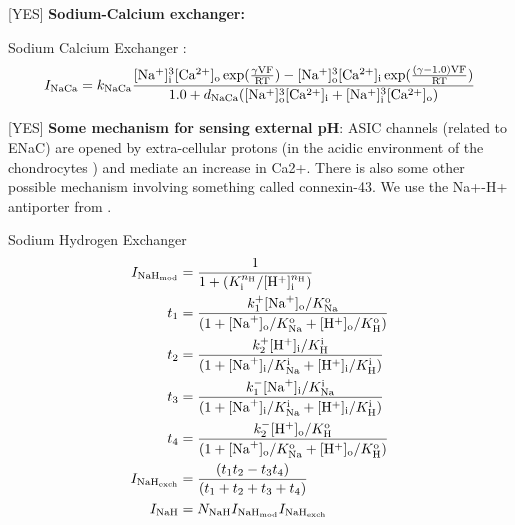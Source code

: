 [YES] {\bf Sodium-Calcium exchanger:}

Sodium Calcium Exchanger \citep[Table 13, pp. 77]{Nygrenetal1998}:
\begin{equation}
  I_{\rm NaCa} = k_{\rm NaCa} \frac{[\rm Na^{+}]^{3}_{i}[\rm
    Ca^{2+}]_{o} \exp(\frac{\gamma V F}{R T}) - [\rm
    Na^{+}]^{3}_{o}[\rm Ca^{2+}]_{i} \exp(\frac{(\gamma - 1.0) V F}{R
      T})} {1.0 + d_{\rm NaCa}([\rm Na^{+}]^{3}_{o}[\rm Ca^{2+}]_{i} +
    [\rm Na^{+}]^{3}_{i}[\rm Ca^{2+}]_{o})}
\end{equation}

[YES] {\bf Some mechanism for sensing external pH}: ASIC channels
(related to ENaC) are opened by extra-cellular protons (in the acidic
environment of the chondrocytes ) and mediate an increase in
Ca2+. There is also some other possible mechanism involving something
called connexin-43. We use the Na+-H+ antiporter from
\citet{Halletal1996,Wilkinsetal2000}.


Sodium Hydrogen Exchanger \citep[Eq. 2, pp. 2675]{Chaetal2009}
\begin{equation}
  \begin{split}
    I_{{\rm NaH}_{\rm mod}} & = \frac{1}{1 + (K_{\rm i}^{n_{\rm
          H}}/[{\rm H}^{+}]_{\rm i}^{n_{\rm H}})}\\
    t_{1} & = \frac{k_{1}^{+} [{\rm Na}^{+}]_{\rm o}/K_{\rm Na}^{\rm
        o}} {(1 + [{\rm Na}^{+}]_{\rm o}/K_{\rm Na}^{\rm o} + [{\rm
        H}^{+}]_{\rm o} /K_{\rm H}^{\rm o})}\\
    t_{2} & = \frac{k_{2}^{+} [{\rm H}^{+}]_{\rm i}/K_{\rm H}^{\rm i}}
    {(1 + [{\rm Na}^{+}]_{\rm i}/K_{\rm Na}^{\rm i} + [{\rm
        H}^{+}]_{\rm i}/K_{\rm H}^{\rm i})}\\
    t_{3} & = \frac{k_{1}^{-} [{\rm Na}^{+}]_{\rm i}/K_{\rm Na}^{\rm
        i}} {(1 + [{\rm Na}^{+}]_{\rm i}/K_{\rm Na}^{\rm i} + [{\rm
        H}^{+}]_{\rm i} /K_{\rm H}^{\rm i})}\\
    t_{4} & = \frac{k_{2}^{-} [{\rm H}^{+}]_{\rm o}/K_{\rm H}^{\rm
        o}} {(1 + [{\rm Na}^{+}]_{\rm o}/K_{\rm Na}^{\rm o} + [{\rm
        H}^{+}]_{\rm o} /K_{\rm H}^{\rm o})}\\
    I_{{\rm NaH}_{\rm exch}} & = \frac{(t_1 t_2 - t_3 t_4)}
    {(t_1 + t_2 + t_3 + t_4)}\\
    I_{\rm NaH} & = N_{\rm NaH} I_{\rm NaH_{\rm mod}}
    I_{\rm NaH_{\rm exch}}
  \end{split}
\end{equation}

